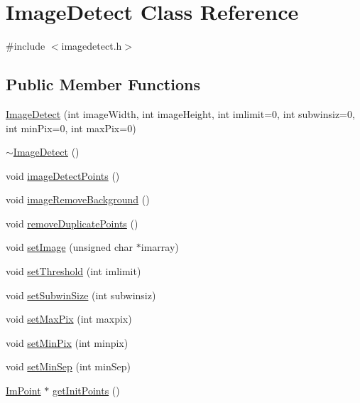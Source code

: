 \hypertarget{class_image_detect}{}\section{Image\+Detect Class Reference}
\label{class_image_detect}


{\ttfamily \#include $<$imagedetect.\+h$>$}

\subsection*{Public Member Functions}
\begin{DoxyCompactItemize}
\item 
\mbox{\hyperlink{class_image_detect_a2ea78db5ab4e9e09bfd4853919c9351e}{Image\+Detect}} (int image\+Width, int image\+Height, int imlimit=0, int subwinsiz=0, int min\+Pix=0, int max\+Pix=0)
\item 
\mbox{\hyperlink{class_image_detect_ae62102131d454c944194d77a9feba76c}{$\sim$\+Image\+Detect}} ()
\item 
void \mbox{\hyperlink{class_image_detect_a9a9779c213e8842fa7c4bdba59dc312e}{image\+Detect\+Points}} ()
\item 
void \mbox{\hyperlink{class_image_detect_a6d6fc10052fa8bc5435d045046005c9c}{image\+Remove\+Background}} ()
\item 
void \mbox{\hyperlink{class_image_detect_a9541c02a480030211d7e5089f80634e0}{remove\+Duplicate\+Points}} ()
\item 
void \mbox{\hyperlink{class_image_detect_a02ed47fccf8c8a00263d3c246d025626}{set\+Image}} (unsigned char $\ast$imarray)
\item 
void \mbox{\hyperlink{class_image_detect_aea9ed08fad1db74ba5ac0925a9ce4642}{set\+Threshold}} (int imlimit)
\item 
void \mbox{\hyperlink{class_image_detect_a4a210d6197477252ce4e50fc79b890d5}{set\+Subwin\+Size}} (int subwinsiz)
\item 
void \mbox{\hyperlink{class_image_detect_a9dda32888b1d56cf47d13e2e195254b2}{set\+Max\+Pix}} (int maxpix)
\item 
void \mbox{\hyperlink{class_image_detect_a11d8d8f15063dd4694136420f61caa9f}{set\+Min\+Pix}} (int minpix)
\item 
void \mbox{\hyperlink{class_image_detect_a76ef2d1c6072b5375a6071e8af461e7b}{set\+Min\+Sep}} (int min\+Sep)
\item 
\mbox{\hyperlink{struct_im_point}{Im\+Point}} $\ast$ \mbox{\hyperlink{class_image_detect_ade0368fed2ea4cccbbc436eb651603a5}{get\+Init\+Points}} ()

\end{DoxyCompactItemize}
